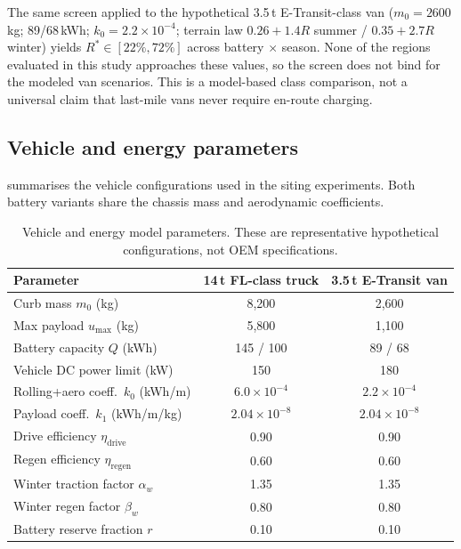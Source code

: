 \documentclass[review,3p,authoryear]{elsarticle}
\newcommand{\Rstar}{R^{*}}
\begin{document}
The same screen applied to the hypothetical 3.5\,t E-Transit-class van
($m_0 = 2600$\,kg; 89/68\,kWh; $k_0 = 2.2 \times 10^{-4}$; terrain law
$0.26 + 1.4R$ summer / $0.35 + 2.7R$ winter) yields
$\Rstar \in [22\%, 72\%]$ across battery $\times$ season.  None of the
regions evaluated in this study approaches these values, so the screen does
not bind for the modeled van scenarios.  This is a model-based class
comparison, not a universal claim that last-mile vans never require
en-route charging.

\subsection{Vehicle and energy parameters}
\label{sec:params}

 summarises the vehicle configurations used in the
siting experiments.  Both battery variants share the chassis mass and
aerodynamic coefficients.

\begin{table}[ht]
\centering
\caption{Vehicle and energy model parameters.
These are representative hypothetical configurations, not OEM specifications.}
\label{tab:vehicles}
\begin{tabular}{lcc}
\toprule
Parameter & 14\,t FL-class truck & 3.5\,t E-Transit van \\
\midrule
Curb mass $m_0$ (kg)                        & 8,200   & 2,600 \\
Max payload $u_{\max}$ (kg)                 & 5,800   & 1,100 \\
Battery capacity $Q$ (kWh)                  & 145 / 100 & 89 / 68 \\
Vehicle DC power limit (kW)                 & 150     & 180 \\
Rolling+aero coeff.\ $k_0$ (kWh/m)        & $6.0\times10^{-4}$ & $2.2\times10^{-4}$ \\
Payload coeff.\ $k_1$ (kWh/m/kg)          & $2.04\times10^{-8}$ & $2.04\times10^{-8}$ \\
Drive efficiency $\eta_{\text{drive}}$      & 0.90    & 0.90 \\
Regen efficiency $\eta_{\text{regen}}$      & 0.60    & 0.60 \\
Winter traction factor $\alpha_w$           & 1.35    & 1.35 \\
Winter regen factor $\beta_w$              & 0.80    & 0.80 \\
Battery reserve fraction $r$               & 0.10    & 0.10 \\
\bottomrule
\end{tabular}
\end{table}
\end{document}
